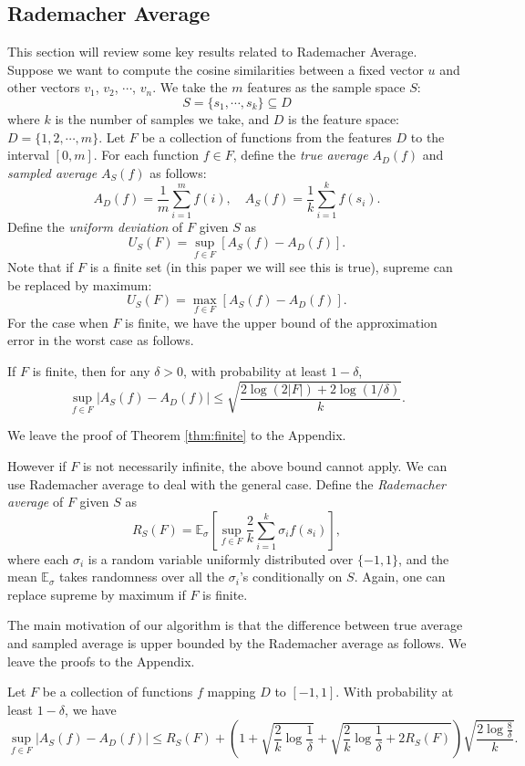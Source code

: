 \documentclass{article}
\begin{document}
\subsection{Rademacher Average}
This section will review some key results related to Rademacher Average. 
Suppose we want to compute the cosine similarities between a fixed vector $u$ and other vectors $v_1$, $v_2$, $\cdots$, $v_n$. We take the $m$ features as the sample space $S$:
$$S = \{s_1, \cdots, s_k\} \subseteq D$$
where $k$ is the number of samples we take, and $D$ is the feature space: $D = \{1,2,\cdots,m\}$.
Let $F$ be a collection of functions from the features $D$ to the interval $[0, m]$.
For each function $f\in F$, define the \emph{true average} $A_D(f)$ and \emph{sampled average} $A_S(f)$ as follows:
$$A_D(f) = \frac{1}{m} \sum_{i=1}^m f(i),\quad A_S(f) = \frac{1}{k} \sum_{i=1}^k f(s_i).$$
Define the \emph{uniform deviation} \cite{Oneto13} of $F$ given $S$ as
$$U_S(F) = \sup_{f\in F} [ A_S(f) - A_D(f) ].$$
Note that if $F$ is a finite set (in this paper we will see this is true), supreme can be replaced by maximum:
$$U_S(F) = \max_{f\in F} [ A_S(f) - A_D(f) ].$$
For the case when $F$ is finite, we have the upper bound of the approximation error in the worst case as follows.
\begin{theorem}
\label{thm:finite}
If $F$ is finite, then for any $\delta > 0$, with probability at least $1-\delta$,
$$\sup_{f\in F} | A_S(f) - A_D(f) | \leq \sqrt{\frac{2\log(2|F|) + 2\log(1/\delta)}{k}}.$$ 
\end{theorem}
We leave the proof of Theorem \ref{thm:finite} to the Appendix.

However if $F$ is not necessarily infinite, the above bound cannot apply. We can use Rademacher average to deal with the general case. 
Define the \emph{Rademacher average} \cite{Mohri09,BM02,Oneto13} of $F$ given $S$ as
\newcommand{\E}{\mathbb{E}}
$$R_S(F) = \E_\sigma \left[\sup_{f\in F} \frac{2}{k}\sum_{i=1}^k \sigma_i f(s_i) \right],$$
where each $\sigma_i$ is a random variable uniformly distributed over $\{-1, 1\}$, and the mean $\E_\sigma$ takes randomness over all the $\sigma_i$'s conditionally on $S$. Again, one can replace supreme by maximum if $F$ is finite.

The main motivation of our algorithm is that the difference between true average and sampled average is upper bounded by the Rademacher average as follows.
We leave the proofs to the Appendix.

\begin{theorem}
\label{thm:main}
Let $F$ be a collection of functions $f$ mapping $D$ to $[-1,1]$. 
With probability at least $1-\delta$, we have
$$\sup_{f\in F}|A_S(f) - A_D(f)| \leq R_S(F) + \left(1+\sqrt{\frac{2}{k}\log \frac{1}{\delta}} + \sqrt{\frac{2}{k}\log \frac{1}{\delta} + 2R_S(F)}\right)\sqrt{\frac{2\log \frac{8}{\delta}}{k}}.$$
\end{theorem}
\end{document}
